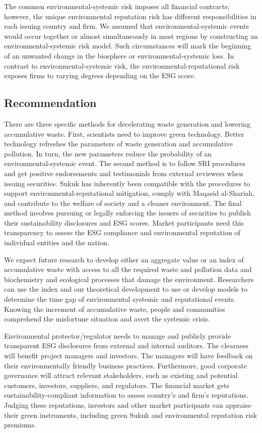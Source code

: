 \documentclass[sn-basic]{sn-jnl}%
\theoremstyle{thmstyleone}%
\theoremstyle{thmstyletwo}%
\theoremstyle{thmstylethree}%
\begin{document}
The common environmental-systemic risk imposes all financial contracts; however, the unique environmental reputation risk has different responsibilities in each issuing country and firm. We assumed that environmental-systemic events would occur together or almost simultaneously in most regions by constructing an environmental-systemic risk model. Such circumstances will mark the beginning of an unwanted change in the biosphere or environmental-systemic loss. In contrast to environmental-systemic risk, the environmental-reputational risk exposes firms to varying degrees depending on the ESG score.

\subsection{Recommendation}
There are three specific methods for decelerating waste generation and lowering accumulative waste. First, scientists need to improve green technology. Better technology refreshes the parameters of waste generation and accumulative pollution. In turn, the new parameters reduce the probability of an environmental-systemic event. The second method is to follow SRI procedures and get positive endorsements and testimonials from external reviewers when issuing securities. Sukuk has inherently been compatible with the procedures to support environmental-reputational mitigation, comply with Maqasid al-Shariah, and contribute to the welfare of society and a cleaner environment. The final method involves pursuing or legally enforcing the issuers of securities to publish their sustainability disclosures and ESG scores. Market participants need this transparency to assess the ESG compliance and environmental reputation of individual entities and the nation.

We expect future research to develop either an aggregate value or an index of accumulative waste with access to all the required waste and pollution data and biochemistry and ecological processes that damage the environment. Researchers can use the index and our theoretical development to use or develop models to determine the time gap of environmental systemic and reputational events. Knowing the increment of accumulative waste, people and communities comprehend the misfortune situation and avert the systemic crisis.

Environmental protector/regulator needs to manage and publicly provide transparent ESG disclosures from external and internal auditors. The clearness will benefit project managers and investors. The managers will have feedback on their environmentally friendly business practices. Furthermore, good corporate governance will attract relevant stakeholders, such as existing and potential customers, investors, suppliers, and regulators. The financial market gets sustainability-compliant information to assess country’s and firm’s reputations. Judging these reputations, investors and other market participants can appraise their green instruments, including green Sukuk and environmental reputation risk premiums.
\end{document}
